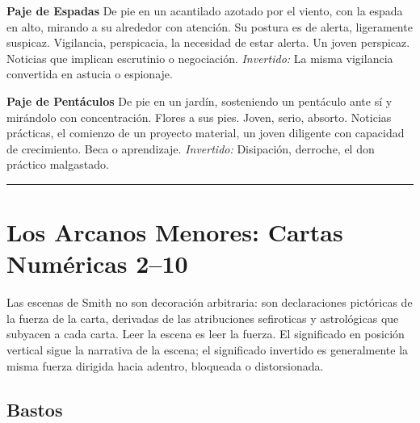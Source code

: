 \textbf{Paje de Espadas} De pie en un acantilado azotado por el viento, con la espada en alto, mirando a su alrededor con atención. Su postura es de alerta, ligeramente suspicaz. Vigilancia, perspicacia, la necesidad de estar alerta. Un joven perspicaz. Noticias que implican escrutinio o negociación. \emph{Invertido:} La misma vigilancia convertida en astucia o espionaje.

\textbf{Paje de Pentáculos} De pie en un jardín, sosteniendo un pentáculo ante sí y mirándolo con concentración. Flores a sus pies. Joven, serio, absorto. Noticias prácticas, el comienzo de un proyecto material, un joven diligente con capacidad de crecimiento. Beca o aprendizaje. \emph{Invertido:} Disipación, derroche, el don práctico malgastado.

\begin{center}\rule{0.5\linewidth}{0.5pt}\end{center}

\section{Los Arcanos Menores: Cartas Numéricas 2--10}\label{the-minor-arcana-pip-cards-210}

Las escenas de Smith no son decoración arbitraria: son declaraciones pictóricas de la fuerza de la carta, derivadas de las atribuciones sefiroticas y astrológicas que subyacen a cada carta. Leer la escena es leer la fuerza. El significado en posición vertical sigue la narrativa de la escena; el significado invertido es generalmente la misma fuerza dirigida hacia adentro, bloqueada o distorsionada.

\subsection{Bastos}\label{wands}


